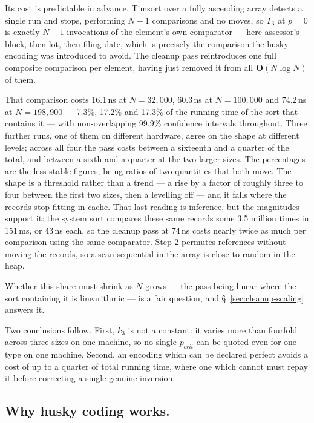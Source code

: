 \documentclass[twoside,leqno,twocolumn]{article}
\begin{document}
Its cost is predictable in advance.
Timsort over a fully ascending array detects a single run and stops,
performing $N-1$ comparisons and no moves,
so $T_3$ at $p = 0$ is exactly $N-1$ invocations of the element's own comparator ---
here assessor's block, then lot, then filing date,
which is precisely the comparison the husky encoding was introduced to avoid.
The cleanup pass reintroduces one full composite comparison per element,
having just removed it from all $\textbf{O}(N \log N)$ of them.

That comparison costs 16.1\,ns at $N = 32{,}000$, 60.3\,ns at $N = 100{,}000$ and 74.2\,ns at
$N = 198{,}900$ --- 7.3\%, 17.2\% and 17.3\% of the running time of the sort that contains it ---
with non-overlapping 99.9\% confidence intervals throughout.
Three further runs, one of them on different hardware, agree on the shape at different levels;
across all four the pass costs between a sixteenth and a quarter of the total,
and between a sixth and a quarter at the two larger sizes.
The percentages are the less stable figures, being ratios of two quantities that both move.
The shape is a threshold rather than a trend --- a rise by a factor of roughly three to four between the first two sizes,
then a levelling off --- and it falls where the records stop fitting in cache.
That last reading is inference, but the magnitudes support it:
the system sort compares these same records some 3.5 million times in 151\,ms, or 43\,ns each,
so the cleanup pass at 74\,ns costs nearly twice as much per comparison using the same comparator.
Step 2 permutes references without moving the records,
so a scan sequential in the array is close to random in the heap.

Whether this share must shrink as $N$ grows --- the pass being linear where the sort containing it is
linearithmic --- is a fair question, and \S~\ref{sec:cleanup-scaling} answers it.

Two conclusions follow.
First, $k_3$ is not a constant: it varies more than fourfold across three sizes on one machine,
so no single $p_{crit}$ can be quoted even for one type on one machine.
Second, an encoding which can be declared perfect avoids a cost of up to a quarter of total running
time, where one which cannot must repay it before correcting a single genuine inversion.

\subsection{Why husky coding works.}
\label{sec:why-husky}
\end{document}
